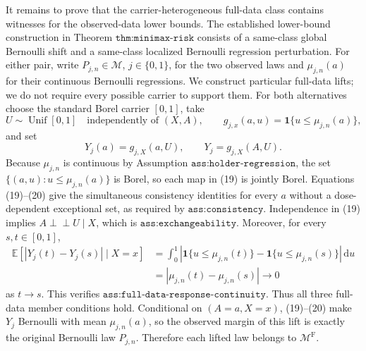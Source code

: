 It remains to prove that the carrier-heterogeneous full-data class contains witnesses for the observed-data lower bounds. The established lower-bound construction in Theorem \(\texttt{thm:minimax-risk}\) consists of a same-class global Bernoulli shift and a same-class localized Bernoulli regression perturbation. For either pair, write \(P_{j,n}\in\mathcal M\), \(j\in\{0,1\}\), for the two observed laws and \(\mu_{j,n}(a)\) for their continuous Bernoulli regressions. We construct particular full-data lifts; we do not require every possible carrier to support them. For both alternatives choose the standard Borel carrier \([0,1]\), take
\[
 U\sim\operatorname{Unif}[0,1]
 \quad\text{independently of }(X,A),
 \qquad
 g_{j,x}(a,u)=\mathbf 1\{u\leq\mu_{j,n}(a)\},
 \tag{19}
\]
and set
\[
 Y_j(a)=g_{j,X}(a,U),
 \qquad
 Y_j=g_{j,X}(A,U).
 \tag{20}
\]
Because \(\mu_{j,n}\) is continuous by Assumption \(\texttt{ass:holder-regression}\), the set \(\{(a,u):u\leq\mu_{j,n}(a)\}\) is Borel, so each map in (19) is jointly Borel. Equations (19)--(20) give the simultaneous consistency identities for every \(a\) without a dose-dependent exceptional set, as required by \(\texttt{ass:consistency}\). Independence in (19) implies \(A\mathbin{\perp\!\!\!\perp}U\mid X\), which is \(\texttt{ass:exchangeability}\). Moreover, for every \(s,t\in[0,1]\),
\[
\begin{aligned}
 \mathbb E[|Y_j(t)-Y_j(s)|\mid X=x]
 &=\int_0^1
 |\mathbf 1\{u\leq\mu_{j,n}(t)\}
  -\mathbf 1\{u\leq\mu_{j,n}(s)\}|\,\mathrm du\\
 &=|\mu_{j,n}(t)-\mu_{j,n}(s)|\longrightarrow0
\end{aligned}
\tag{21}
\]
as \(t\to s\). This verifies \(\texttt{ass:full-data-response-continuity}\). Thus all three full-data member conditions hold. Conditional on \((A=a,X=x)\), (19)--(20) make \(Y_j\) Bernoulli with mean \(\mu_{j,n}(a)\), so the observed margin of this lift is exactly the original Bernoulli law \(P_{j,n}\). Therefore each lifted law belongs to \(\mathcal M^{\mathrm F}\).

